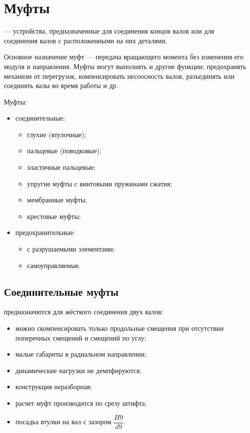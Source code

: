 \chapter{Муфты}

 --- устройства, предназначенные для соединения концов валов или для соединения валов с расположенными на них деталями. 

Основное назначение муфт --- передача вращающего момента без изменения его модуля и направления. Муфты могут выполнять и другие функции: предохранять механизм от перегрузок, компенсировать несоосность валов, разъединять или соединять валы во время работы и др.

Муфты: 
\begin{itemize}
	\item соединительные:
	\begin{itemize}
		\item глухие (втулочные);
		\item пальцевые (поводковые);
		\item эластичные пальцевые;
		\item упругие муфты с винтовыми пружинами сжатия;
		\item мембранные муфты;
		\item крестовые муфты;
	\end{itemize}
	\item предохранительные:
	\begin{itemize}
		\item с разрушаемыми элементами;
		\item самоуправляемые.
	\end{itemize}
\end{itemize}

\section{Соединительные муфты}

 предназначются для жёсткого соединения двух валов:
\begin{itemize}
	\item можно скомпенсировать только продольные смещения при отсутствии поперечных смещений и смещений по углу;
	\item малые габариты в радиальном направлении;
	\item динамические нагрузки не демпфируются;
	\item конструкция неразборная;
	\item расчет муфт производится по срезу штифта;
	\item посадка втулки на вал с зазором $ \dfrac{H9}{d9} $.
\end{itemize}

